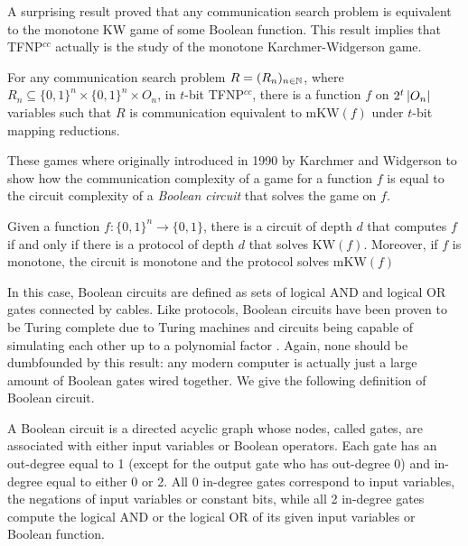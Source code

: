 A surprising result \cite{span_programs, adventures_monotone_tfnp} proved that any communication search problem is equivalent to the monotone KW game of some Boolean function. This result implies that \textsf{TFNP}$^{cc}$ actually is the study of the monotone Karchmer-Widgerson game.

\begin{lemma}
    For any communication search problem $R = (R_n)_{n \in \mathbb{N}}$, where $R_n \subseteq \{0,1\}^n \times \{0,1\}^n \times O_n$, in $t$-bit \textsf{TFNP}$^{cc}$, there is a function $f$ on $2^t\left|O_n\right|$ variables such that $R$ is communication equivalent to $\mathrm{mKW}(f)$ under $t$-bit mapping reductions.
\end{lemma}

These games where originally introduced in 1990 by Karchmer and Widgerson \cite{kw_games} to show how the communication complexity of a game for a function $f$ is equal to the circuit complexity of a \textit{Boolean circuit} that solves the game on $f$.

\begin{theorem}
    Given a function $f : \{0, 1\}^n \to \{0, 1\}$, there is a circuit of depth $d$ that computes $f$ if and only if there is a protocol of depth $d$ that solves $\mathrm{KW}(f)$. Moreover, if $f$ is monotone, the circuit is monotone and the protocol solves $\mathrm{mKW}(f)$
\end{theorem}

In this case, Boolean circuits are defined as sets of logical AND and logical OR gates connected by cables. Like protocols, Boolean circuits have been proven to be Turing complete due to Turing machines and circuits being capable of simulating each other up to a polynomial factor \cite{sipser_computation}. Again, none should be dumbfounded by this result: any modern computer is actually just a large amount of Boolean gates wired together. We give the following definition of Boolean circuit. \cite{comm_compl_appl}

\begin{definition}
    A Boolean circuit is a directed acyclic graph whose nodes, called gates, are associated with either input variables or Boolean operators. Each gate has an out-degree equal to 1 (except for the output gate who has out-degree 0) and in-degree equal to either 0 or 2. All 0 in-degree gates correspond to input variables, the negations of input variables or constant bits, while all 2 in-degree gates compute the logical AND or the logical OR of its given input variables or Boolean function. 
\end{definition}


